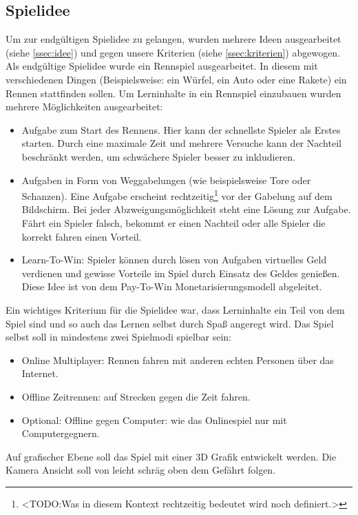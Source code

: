 \subsection{Spielidee}\label{ssec:spielidee}
	Um zur endgültigen Spielidee zu gelangen, wurden mehrere Ideen ausgearbeitet (siehe \ref{ssec:idee}) und gegen unsere Kriterien (siehe \ref{ssec:kriterien}) abgewogen.
	Als endgültige Spielidee wurde ein Rennspiel ausgearbeitet. In diesem mit verschiedenen Dingen (Beispielsweise: ein Würfel, ein Auto oder eine Rakete) ein Rennen stattfinden sollen. Um Lerninhalte in ein Rennspiel einzubauen wurden mehrere Möglichkeiten ausgearbeitet:
	\begin{itemize}
		\item{ Aufgabe zum Start des Rennens. Hier kann der schnellste Spieler als Erstes starten. Durch eine maximale Zeit und mehrere Versuche kann der Nachteil beschränkt werden, um schwächere Spieler besser zu inkludieren. }
		\item{ Aufgaben in Form von Weggabelungen (wie beispielsweise Tore oder Schanzen). Eine Aufgabe erscheint rechtzeitig\footnote{<TODO:Was in diesem Kontext rechtzeitig bedeutet wird noch definiert.>} vor der Gabelung auf dem Bildschirm. Bei jeder Abzweigungsmöglichkeit steht eine Lösung zur Aufgabe. Fährt ein Spieler falsch, bekommt er einen Nachteil oder alle Spieler die korrekt fahren einen Vorteil. }
		\item{ Learn-To-Win: Spieler können durch lösen von Aufgaben virtuelles Geld verdienen und gewisse Vorteile im Spiel durch Einsatz des Geldes genießen. Diese Idee ist von dem Pay-To-Win Monetarisierungsmodell abgeleitet. }
	\end{itemize}
	Ein wichtiges Kriterium für die Spielidee war, dass Lerninhalte ein Teil von dem Spiel sind und so auch das Lernen selbst durch Spaß angeregt wird.
	Das Spiel selbst soll in mindestens zwei Spielmodi spielbar sein:
	\begin{itemize}
		\item{ Online Multiplayer: Rennen fahren mit anderen echten Personen über das Internet. }
		\item{ Offline Zeitrennen: auf Strecken gegen die Zeit fahren. }
		\item{ Optional: Offline gegen Computer: wie das Onlinespiel nur mit Computergegnern. }
	\end{itemize}
	Auf grafischer Ebene soll das Spiel mit einer 3D Grafik entwickelt werden. Die Kamera Ansicht soll von leicht schräg oben dem Gefährt folgen.


